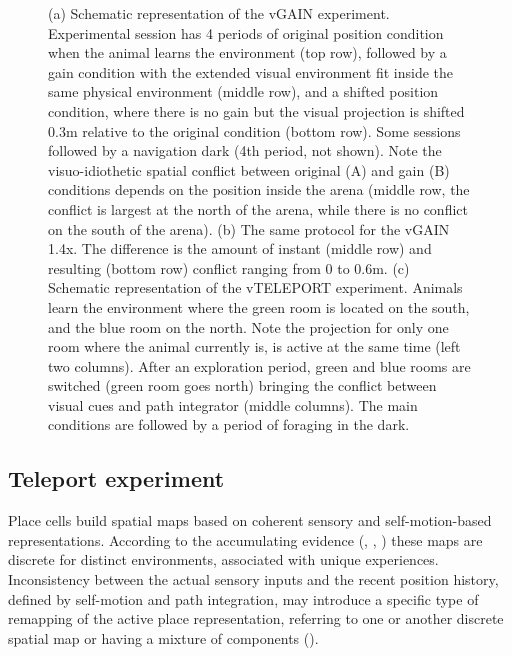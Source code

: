 \begin{figure}
{(a) Schematic representation of the vGAIN experiment. Experimental session has 4 periods of original position condition when the animal learns the environment (top row), followed by a gain condition with the extended visual environment fit inside the same physical environment (middle row), and a shifted position condition, where there is no gain but the visual projection is shifted 0.3m relative to the original condition (bottom row). Some sessions followed by a navigation dark (4th period, not shown). Note the visuo-idiothetic spatial conflict between original (A) and gain (B) conditions depends on the position inside the arena (middle row, the conflict is largest at the north of the arena, while there is no conflict on the south of the arena). (b) The same protocol for the vGAIN 1.4x. The difference is the amount of instant (middle row) and resulting (bottom row) conflict ranging from 0 to 0.6m. (c) Schematic representation of the vTELEPORT experiment. Animals learn the environment where the green room is located on the south, and the blue room on the north. Note the projection for only one room where the animal currently is, is active at the same time (left two columns). After an exploration period, green and blue rooms are switched (green room goes north) bringing the conflict between visual cues and path integrator (middle columns). The main conditions are followed by a period of foraging in the dark.
}
\label{fig:F8_vGAIN}
\end{figure}


\subsection{Teleport experiment}

Place cells build spatial maps based on coherent sensory and self-motion-based representations. According to the accumulating evidence (\cite{Gothard1996}, \cite{Samsonovich1997}, \cite{Derdikman2009}) these maps are discrete for distinct environments, associated with unique experiences. Inconsistency between the actual sensory inputs and the recent position history, defined by self-motion and path integration, may introduce a specific type of remapping of the active place representation, referring to one or another discrete spatial map or having a mixture of components (\cite{Jezek2011}).

